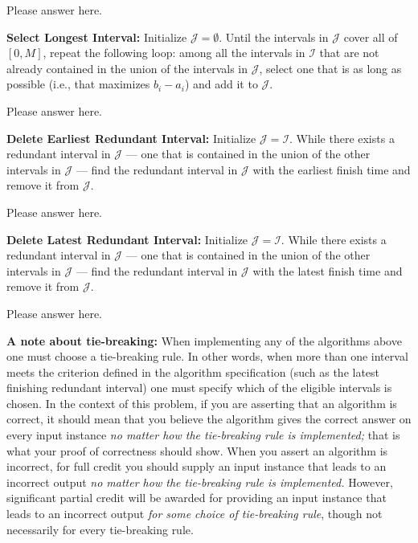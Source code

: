 \documentclass{hw}
\begin{document}
\begin{problem}
\begin{solution}
Please answer here.
\end{solution}

  \begin{subproblem}
    \textbf{Select Longest Interval:}
  Initialize $\mathcal{J}=\emptyset$.
  Until the intervals in $\mathcal{J}$ cover all of $[0,M]$,
  repeat the following loop: among all the intervals in
  $\mathcal{I}$ that are not already contained in the union
  of the intervals in $\mathcal{J}$, select one that is as
  long as possible (i.e., that maximizes $b_i-a_i$) and
  add it to $\mathcal{J}$.
  \end{subproblem}

\begin{solution}
Please answer here.
\end{solution}

  \begin{subproblem}
    \textbf{Delete Earliest Redundant Interval:}
  Initialize $\mathcal{J}=\mathcal{I}$. While there
  exists a redundant interval in $\mathcal{J}$ --- one
  that is contained in the union of the other intervals
  in $\mathcal{J}$ --- find the redundant interval in
  $\mathcal{J}$ with the earliest finish time and
  remove it from $\mathcal{J}$.
\end{subproblem}

\begin{solution}
Please answer here.
\end{solution}

\begin{subproblem}
    \textbf{Delete Latest Redundant Interval:}
  Initialize $\mathcal{J}=\mathcal{I}$. While there
  exists a redundant interval in $\mathcal{J}$ --- one
  that is contained in the union of the other intervals
  in $\mathcal{J}$ --- find the redundant interval in
  $\mathcal{J}$ with the latest finish time and remove it
  from $\mathcal{J}$.
\end{subproblem}

\begin{solution}
Please answer here.
\end{solution}

{\bf A note about tie-breaking:}
When implementing any of the algorithms above one must
choose a tie-breaking rule. In other words, when more than
one interval meets the criterion defined in the algorithm
specification (such as the latest finishing redundant
interval) one must specify which of the eligible
intervals is chosen. In the context of this problem,
if you are asserting that an algorithm is correct,
it should mean that you believe the algorithm gives
the correct answer on every input instance
{\em no matter how the tie-breaking rule is implemented;}
that is what your proof of correctness should show.
When you assert an algorithm is incorrect,
for full credit you should supply an input instance
that leads to an incorrect output {\em no matter how
the tie-breaking rule is implemented.} However,
significant partial credit will be awarded for
providing an input instance that leads to an incorrect
output {\em for some choice of tie-breaking rule},
though not necessarily for every tie-breaking rule.

\end{problem}
\end{document}
